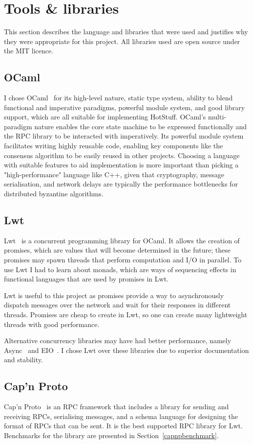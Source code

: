 \section{Tools \& libraries} \label{tools}
This section describes the language and libraries that were used and justifies why they were appropriate for this project. All libraries used are open source under the MIT licence.

\subsection{OCaml}
I chose OCaml~\cite{ocaml} for its high-level nature, static type system, ability to blend functional and imperative paradigms, powerful module system, and good library support, which are all suitable for implementing HotStuff. OCaml's multi-paradigm nature enables the core state machine to be expressed functionally and the RPC library to be interacted with imperatively. Its powerful module system facilitates writing highly reusable code, enabling key components like the consensus algorithm to be easily reused in other projects. Choosing a language with suitable features to aid implementation is more important than picking a "high-performance" language like C++, given that cryptography, message serialisation, and network delays are typically the performance bottlenecks for distributed byzantine algorithms.

\subsection{Lwt}
Lwt~\cite{lwt} is a concurrent programming library for OCaml. It allows the creation of promises, which are values that will become determined in the future; these promises may spawn threads that perform computation and I/O in parallel. To use Lwt I had to learn about monads, which are ways of sequencing effects in functional languages that are used by promises in Lwt.

Lwt is useful to this project as promises provide a way to asynchronously dispatch messages over the network and wait for their responses in different threads. Promises are cheap to create in Lwt, so one can create many lightweight threads with good performance.

Alternative concurrency libraries may have had better performance, namely Async~\cite{async} and EIO~\cite{eio}. I chose Lwt over these libraries due to superior documentation and stability.

\subsection{Cap'n Proto}
Cap'n Proto~\cite{capnp} is an RPC framework that includes a library for sending and receiving RPCs, serialising messages, and a schema language for designing the format of RPCs that can be sent. It is the best supported RPC library for Lwt. Benchmarks for the library are presented in Section~\ref{capnpbenchmark}.

